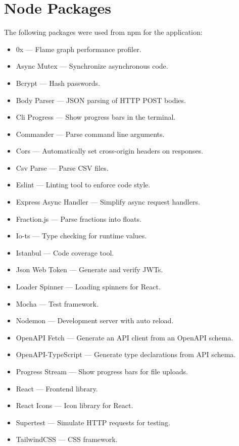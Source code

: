 \documentclass[11pt, twoside, a4paper]{report}
\begin{document}
\nocite{*}
\printbibliography[category=cited]{}

\section{Node Packages}
The following packages were used from npm for the application:
\begin{itemize}
    \item 0x --- Flame graph performance profiler.
    \item Async Mutex --- Synchronize asynchronous code.
    \item Bcrypt --- Hash passwords.
    \item Body Parser --- JSON parsing of HTTP POST bodies.
    \item Cli Progress --- Show progress bars in the terminal.
    \item Commander --- Parse command line arguments.
    \item Cors --- Automatically set cross-origin headers on responses.
    \item Csv Parse --- Parse CSV files.
    \item Eslint --- Linting tool to enforce code style.
    \item Express Async Handler --- Simplify async request handlers.
    \item Fraction.js --- Parse fractions into floats.
    \item Io-ts --- Type checking for runtime values.
    \item Istanbul --- Code coverage tool.
    \item Json Web Token --- Generate and verify JWTs.
    \item Loader Spinner --- Loading spinners for React.
    \item Mocha --- Test framework.
    \item Nodemon --- Development server with auto reload.
    \item OpenAPI Fetch --- Generate an API client from an OpenAPI schema.
    \item OpenAPI-TypeScript --- Generate type declarations from API schema.
    \item Progress Stream --- Show progress bars for file uploads.
    \item React --- Frontend library.
    \item React Icons --- Icon library for React.
    \item Supertest --- Simulate HTTP requests for testing.
    \item TailwindCSS --- CSS framework.

\end{itemize}
\end{document}
